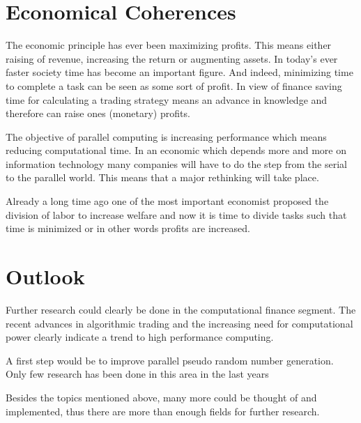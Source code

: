 \section{Economical Coherences}

The economic principle has ever been maximizing
profits. This means either raising of revenue, increasing the return
or augmenting assets. In today's ever faster society time has become
an important figure. And indeed, minimizing time to complete a task
can be seen as some sort of profit. In view of finance saving time for
calculating a trading strategy means an advance in knowledge and
therefore can raise ones (monetary) profits.

The objective of parallel
computing is increasing performance which means reducing computational
time. In an economic which depends more and more on information
technology many companies will have to do the step from the serial to
the parallel world. This means that a major rethinking will take place. 

Already a long time ago one of the most important economist \cite{smith:iin}
proposed the division of labor to increase welfare and now it is time
to divide tasks such that time is minimized or in other words profits
are increased.

\section{Outlook}



Further research could clearly be done in the computational finance
segment. The recent advances in algorithmic trading and the increasing
need for computational power clearly indicate a  trend to high
performance computing.

A first step would be to improve parallel pseudo random number
generation. Only few research has been done in this area in the last
years 








Besides the topics mentioned above, many more could be thought of and
implemented, thus there are more than enough fields for further
research.


